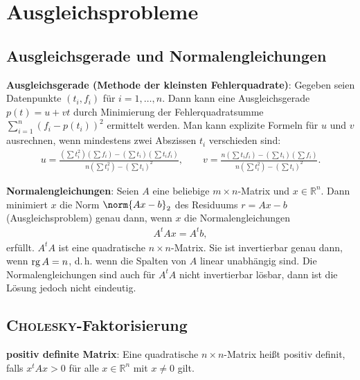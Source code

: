 \section{%
    Ausgleichsprobleme%
}

\subsection{%
    Ausgleichsgerade und Normalengleichungen%
}

\textbf{Ausgleichsgerade (Methode der kleinsten Fehlerquadrate)}:
Gegeben seien Datenpunkte $(t_i, f_i)$ für $i = 1, \dotsc, n$.
Dann kann eine Ausgleichsgerade $p(t) = u + vt$ durch Minimierung
der Fehlerquadratsumme
$\sum_{i=1}^n (f_i - p(t_i))^2$ ermittelt werden.
Man kann explizite Formeln für $u$ und $v$ ausrechnen,
wenn mindestens zwei Abszissen $t_i$ verschieden sind:
\begin{align*}
    u = \frac{(\sum t_i^2) (\sum f_i) - (\sum t_i) (\sum t_i f_i)}
    {n (\sum t_i^2) - (\sum t_i)^2}, \qquad
    v = \frac{n(\sum t_i f_i) - (\sum t_i) (\sum f_i)}
    {n (\sum t_i^2) - (\sum t_i)^2}.
\end{align*}

\linie

\textbf{Normalengleichungen}:
Seien $A$ eine beliebige $m \times n$-Matrix und $x \in \mathbb{R}^n$.
Dann minimiert $x$ die Norm $\norm{Ax - b}_2$ des Residuums $r = Ax - b$
(Ausgleichsproblem) genau dann, wenn $x$ die Normalengleichungen
\begin{align*}
    A^t Ax = A^t b,
\end{align*}
erfüllt.
$A^t A$ ist eine quadratische $n \times n$-Matrix.
Sie ist invertierbar genau dann, wenn $\operatorname{rg} A = n$, d.\,h. wenn die Spalten
von $A$ linear unabhängig sind.
Die Normalengleichungen sind auch für $A^t A$ nicht invertierbar lösbar,
dann ist die Lösung jedoch nicht eindeutig.

\subsection{%
    \textsc{Cholesky}-Faktorisierung%
}

\textbf{positiv definite Matrix}:
Eine quadratische $n \times n$-Matrix heißt positiv definit, falls
$x^t A x > 0$ für alle $x \in \mathbb{R}^n$ mit $x \not= 0$ gilt.

